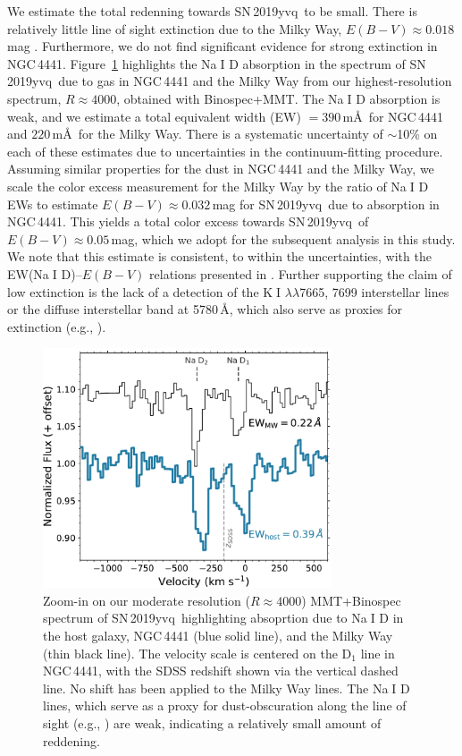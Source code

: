 \documentclass[twocolumn]{aastex63}
\def\ion#1#2{#1$\;${\footnotesize\rm{#2}}\relax}
\newcommand{\sn}{SN\,2019yvq}
\begin{document}
We estimate the total redenning towards \sn\ to be small. There is relatively
little line of sight extinction due to the Milky Way, $E(B-V) \approx
0.018$\,mag \citep{Schlafly11, Schlegel98}. Furthermore, we do not find
significant evidence for strong extinction in NGC\,4441. Figure~\ref{fig:NaD}
highlights the \ion{Na}{I} D absorption in the spectrum of \sn\ due to gas in
NGC\,4441 and the Milky Way from our highest-resolution spectrum, $R \approx
4000$, obtained with Binospec+MMT. The \ion{Na}{I} D absorption is weak, and
we estimate a total equivalent width (EW) $= 390$\,m\AA\ for NGC\,4441 and
$220$\,m\AA\ for the Milky Way. There is a systematic uncertainty of
$\sim$10\% on each of these estimates due to uncertainties in the
continuum-fitting procedure. Assuming similar properties for the dust in
NGC\,4441 and the Milky Way, we scale the color excess measurement for the
Milky Way by the ratio of \ion{Na}{I} D EWs to estimate $E(B-V) \approx
0.032$\,mag for \sn\ due to absorption in NGC\,4441. This yields a total
color excess towards \sn\ of $E(B-V) \approx 0.05$\,mag, which we adopt for
the subsequent analysis in this study. We note that this estimate is
consistent, to within the uncertainties, with the EW(\ion{Na}{I} D)--$E(B-V)$
relations presented in \citet{Poznanski12}. Further supporting the claim of
low extinction is the lack of a detection of the \ion{K}{I}
$\lambda\lambda$7665, 7699 interstellar lines or the diffuse interstellar
band at 5780\,\AA, which also serve as proxies for extinction (e.g.,
\citealt{Phillips13}).

\begin{figure}
    \centering
    \includegraphics[width=3.35in]{./figures/NaD.pdf}
    \caption{Zoom-in on our moderate resolution ($R \approx 4000$)
    MMT+Binospec spectrum of \sn\ highlighting absoprtion due to \ion{Na}{I}
    D in the host galaxy, NGC\,4441 (blue solid line), and the Milky Way
    (thin black line). The velocity scale is centered on the D$_1$ line in
    NGC\,4441, with the SDSS redshift shown via the vertical dashed line. No
    shift has been applied to the Milky Way lines. The \ion{Na}{I} D lines,
    which serve as a proxy for dust-obscuration along the line of sight
    (e.g., \citealt{Poznanski12,Phillips13}) are weak, indicating a
    relatively small amount of reddening.}
    \label{fig:NaD}
\end{figure}
\end{document}
